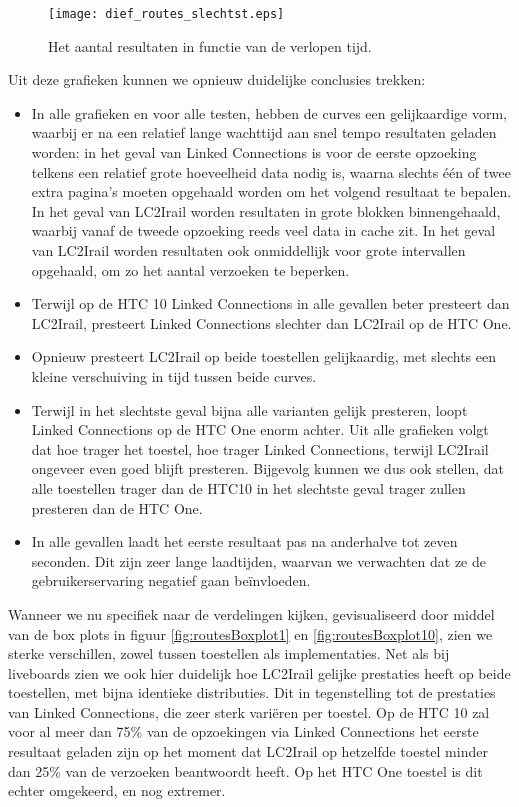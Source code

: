 \begin{figure}[h]
	\centering
	\texttt{[image: dief\_routes\_slechtst.eps]}
	\caption[Aantal resultaten routes in functie van de tijd]{Het aantal resultaten in functie van de verlopen tijd.}
	\label{fig:routesDiefSlechtst}
\end{figure}

Uit deze grafieken kunnen we opnieuw duidelijke conclusies trekken:
\begin{itemize}
	\item In alle grafieken en voor alle testen, hebben de curves een gelijkaardige vorm, waarbij er na een relatief lange wachttijd aan snel tempo resultaten geladen worden: in het geval van Linked Connections is voor de eerste opzoeking telkens een relatief grote hoeveelheid data nodig is, waarna slechts één of twee extra pagina's moeten opgehaald worden om het volgend resultaat te bepalen. In het geval van LC2Irail worden resultaten in grote blokken binnengehaald, waarbij vanaf de tweede opzoeking reeds veel data in cache zit. In het geval van LC2Irail worden resultaten ook onmiddellijk voor grote intervallen opgehaald, om zo het aantal verzoeken te beperken. 
	\item Terwijl op de HTC 10 Linked Connections in alle gevallen beter presteert dan LC2Irail, presteert Linked Connections slechter dan LC2Irail op de HTC One. 
	\item Opnieuw presteert LC2Irail op beide toestellen gelijkaardig, met slechts een kleine verschuiving in tijd tussen beide curves.
	\item Terwijl in het slechtste geval bijna alle varianten gelijk presteren, loopt Linked Connections op de HTC One enorm achter. Uit alle grafieken volgt dat hoe trager het toestel, hoe trager Linked Connections, terwijl LC2Irail ongeveer even goed blijft presteren. Bijgevolg kunnen we dus ook stellen, dat alle toestellen trager dan de HTC10 in het slechtste geval trager zullen presteren dan de HTC One.
	\item In alle gevallen laadt het eerste resultaat pas na anderhalve tot zeven seconden. Dit zijn zeer lange laadtijden, waarvan we verwachten dat ze de gebruikerservaring negatief gaan beïnvloeden.
\end{itemize}

Wanneer we nu specifiek naar de verdelingen kijken, gevisualiseerd door middel van de box plots in figuur \ref{fig:routesBoxplot1} en \ref{fig:routesBoxplot10}, zien we sterke verschillen, zowel tussen toestellen als implementaties. Net als bij liveboards zien we ook hier duidelijk hoe LC2Irail gelijke prestaties heeft op beide toestellen, met bijna identieke distributies. Dit in tegenstelling tot de prestaties van Linked Connections, die zeer sterk variëren per toestel. Op de HTC 10 zal voor al meer dan 75\% van de opzoekingen via Linked Connections het eerste resultaat geladen zijn op het moment dat LC2Irail op hetzelfde toestel minder dan 25\% van de verzoeken beantwoordt heeft. Op het HTC One toestel is dit echter omgekeerd, en nog extremer. 

